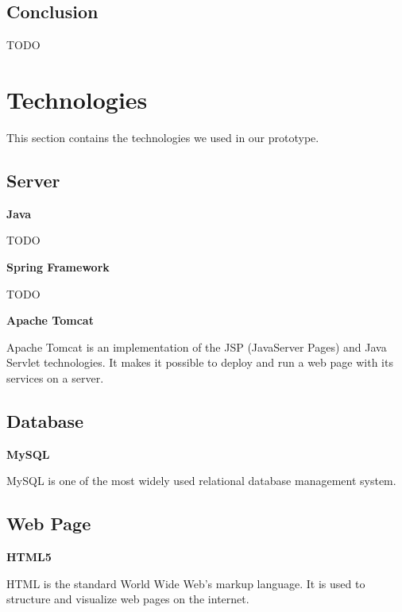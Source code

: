 \subsection{Conclusion}

TODO

\section{Technologies}

This section contains the technologies we used in our prototype.

\subsection{Server}

\textbf{Java}

TODO

\textbf{Spring Framework}

TODO

\textbf{Apache Tomcat}

Apache Tomcat is an implementation of the JSP (JavaServer Pages) and Java Servlet technologies.
It makes it possible to deploy and run a web page with its services on a server.

\subsection{Database}

\textbf{MySQL}

MySQL is one of the most widely used relational database management system.

\subsection{Web Page}

\textbf{HTML5}

HTML is the standard World Wide Web's markup language.
It is used to structure and visualize web pages on the internet.

